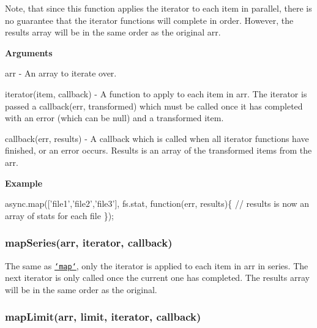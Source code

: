 Note, that since this function applies the {\ttfamily iterator} to each item in parallel, there is no guarantee that the {\ttfamily iterator} functions will complete in order. However, the results array will be in the same order as the original {\ttfamily arr}.

{\bfseries Arguments}


\begin{DoxyItemize}
\item {\ttfamily arr} -\/ An array to iterate over.
\item {\ttfamily iterator(item, callback)} -\/ A function to apply to each item in {\ttfamily arr}. The iterator is passed a {\ttfamily callback(err, transformed)} which must be called once it has completed with an error (which can be {\ttfamily null}) and a transformed item.
\item {\ttfamily callback(err, results)} -\/ A callback which is called when all {\ttfamily iterator} functions have finished, or an error occurs. Results is an array of the transformed items from the {\ttfamily arr}.
\end{DoxyItemize}

{\bfseries Example}


\begin{DoxyCode}
async.map([\textcolor{stringliteral}{'file1'},\textcolor{stringliteral}{'file2'},\textcolor{stringliteral}{'file3'}], fs.stat, \textcolor{keyword}{function}(err, results)\{
    \textcolor{comment}{// results is now an array of stats for each file}
\});
\end{DoxyCode}
 



\label{_mapSeries}%
 \subsubsection*{map\+Series(arr, iterator, callback)}

The same as \href{#map}{\tt `map`}, only the {\ttfamily iterator} is applied to each item in {\ttfamily arr} in series. The next {\ttfamily iterator} is only called once the current one has completed. The results array will be in the same order as the original.





\label{_mapLimit}%
 \subsubsection*{map\+Limit(arr, limit, iterator, callback)}

